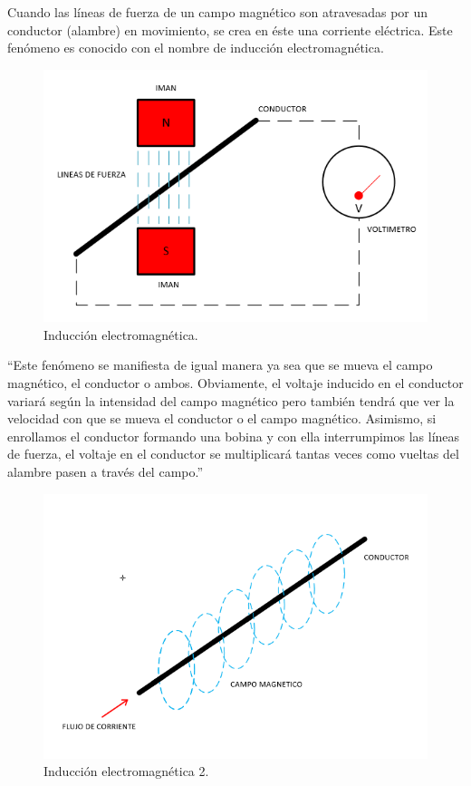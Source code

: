 Cuando las líneas de fuerza de un campo magnético son
atravesadas por un conductor (alambre) en movimiento, se crea en éste
una corriente eléctrica. Este fenómeno es conocido con el nombre de
inducción electromagnética.\\

\begin{figure}[H]
\centering
\includegraphics[width=12cm]{capitulo3/figs/induc.png}
\caption{ Inducción electromagnética.}
\end{figure}

``Este fenómeno se manifiesta de igual manera ya sea que se
mueva el campo magnético, el conductor o ambos. Obviamente, el voltaje
inducido en el conductor variará según la intensidad del campo magnético
pero también tendrá que ver la velocidad con que se mueva el conductor o el campo magnético. Asimismo, si enrollamos el conductor formando una
bobina y con ella interrumpimos las líneas de fuerza, el voltaje en el
conductor se multiplicará tantas veces como vueltas del alambre pasen a
través del campo.''\\

\begin{figure}[H]
\centering
\includegraphics[width=12cm]{capitulo3/figs/trans2.png}
\caption{ Inducción electromagnética 2.}
\end{figure}

